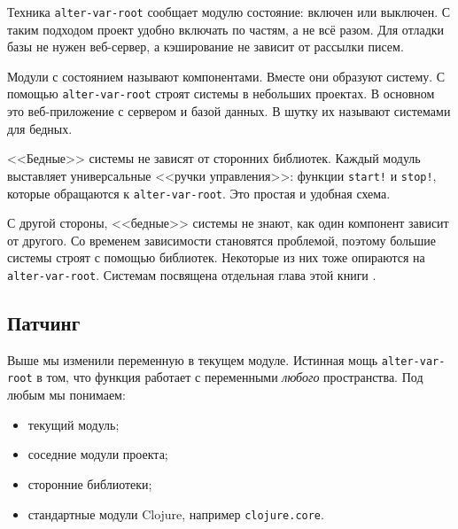 
\label{systems-intro}

Техника \verb|alter-var-root| сообщает модулю состояние: включен или
выключен. С таким подходом проект удобно включать по частям, а не всё
разом. Для отладки базы не нужен веб-сервер, а кэширование не зависит от
рассылки писем.

Модули с состоянием называют компонентами. Вместе они образуют систему. С
помощью \verb|alter-var-root| строят системы в небольших проектах. В основном
это веб-приложение с сервером и базой данных. В шутку их называют системами для
бедных.


<<Бедные>> системы не зависят от сторонних библиотек. Каждый модуль выставляет
универсальные <<ручки управления>>: функции \verb|start!| и \verb|stop!|,
которые обращаются к \verb|alter-var-root|. Это простая и удобная схема.

С другой стороны, <<бедные>> системы не знают, как один компонент зависит от
другого. Со временем зависимости становятся проблемой, поэтому большие системы
строят с помощью библиотек. Некоторые из них тоже опираются на
\verb|alter-var-root|. Системам посвящена отдельная глава этой
книги .

\subsection{Патчинг}


Выше мы изменили переменную в текущем модуле. Истинная мощь
\verb|alter-var-root| в том, что функция работает с переменными \emph{любого}
пространства. Под любым мы понимаем:

\begin{itemize}

\item
  текущий модуль;

\item
  соседние модули проекта;

\item
  сторонние библиотеки;

\item
  стандартные модули Clojure, например \texttt{clo\-ju\-re.co\-re}.

\end{itemize}


